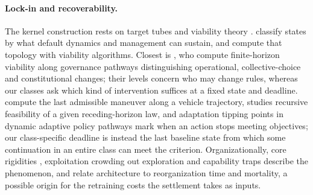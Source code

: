 \documentclass[11pt]{article}
\theoremstyle{plain}
\theoremstyle{definition}
\begin{document}
\paragraph{Lock-in and recoverability.} The kernel construction rests on target tubes \citep{BertsekasRhodes1971} and viability theory \citep{Aubin1991}. \citet{HeitzigEtAl2016} classify states by what default dynamics and management can sustain, and \citet{KittelEtAl2021} compute that topology with viability algorithms. Closest is \citet{PichancourtEtAl2025}, who compute finite-horizon viability along governance pathways distinguishing operational, collective-choice and constitutional changes; their levels concern who may change rules, whereas our classes ask which kind of intervention suffices at a fixed state and deadline. \citet{SoentgesEtAl2018} compute the last admissible maneuver along a vehicle trajectory, \citet{Lofberg2012} studies recursive feasibility of a given receding-horizon law, and adaptation tipping points in dynamic adaptive policy pathways \citep{HaasnootEtAl2013} mark when an action stops meeting objectives; our class-specific deadline is instead the last baseline state from which some continuation in an entire class can meet the criterion. Organizationally, core rigidities \citep{LeonardBarton1992}, exploitation crowding out exploration \citep{March1991} and capability traps \citep{RepenningSterman2002} describe the phenomenon, and \citet{HannanEtAl2003} relate architecture to reorganization time and mortality, a possible origin for the retraining costs the settlement takes as inputs.
\end{document}

